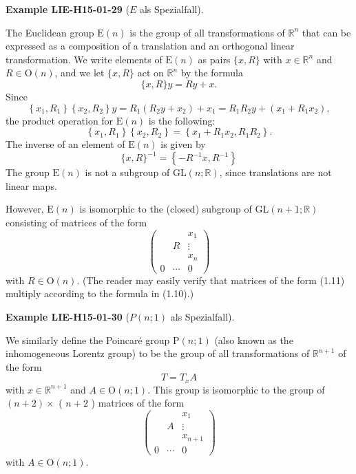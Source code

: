 \documentclass[10pt, letterpaper]{article}
\newcommand{\CustomHeading}[3]{%
  \par\medskip\noindent%
  \textbf{#1 #2} \textnormal{(#3)}.\enskip%
}
\newenvironment{EXA}[2]{\CustomHeading{Example}{#1}{#2}}{}
\begin{document}
\begin{EXA}{LIE-H15-01-29}{$E$ als Spezialfall}
The Euclidean group $\mathrm{E}(n)$ is the group of all transformations of $\mathbb{R}^{n}$ that can be expressed as a composition of a translation and an orthogonal linear transformation. We write elements of $\mathrm{E}(n)$ as pairs $\{x, R\}$ with $x \in \mathbb{R}^{n}$ and $R \in \mathrm{O}(n)$, and we let $\{x, R\}$ act on $\mathbb{R}^{n}$ by the formula
$$
\{x, R\} y=R y+x .
$$
Since
$$
\left\{x_{1}, R_{1}\right\}\left\{x_{2}, R_{2}\right\} y=R_{1}\left(R_{2} y+x_{2}\right)+x_{1}=R_{1} R_{2} y+\left(x_{1}+R_{1} x_{2}\right),
$$
the product operation for $\mathrm{E}(n)$ is the following:
$$
\left\{x_{1}, R_{1}\right\}\left\{x_{2}, R_{2}\right\}=\left\{x_{1}+R_{1} x_{2}, R_{1} R_{2}\right\} .
$$
The inverse of an element of $\mathrm{E}(n)$ is given by
$$
\{x, R\}^{-1}=\left\{-R^{-1} x, R^{-1}\right\}
$$
The group $\mathrm{E}(n)$ is not a subgroup of $\mathrm{GL}(n ; \mathbb{R})$, since translations are not linear maps.

However, $\mathrm{E}(n)$ is isomorphic to the (closed) subgroup of $\mathrm{GL}(n+1 ; \mathbb{R})$ consisting of matrices of the form
$$
\left(\begin{array}{ccc} 
& & x_{1} \\
& R & \vdots \\
& & x_{n} \\
0 & \cdots & 0
\end{array}\right)
$$
with $R \in \mathrm{O}(n)$. (The reader may easily verify that matrices of the form (1.11) multiply according to the formula in (1.10).)
\end{EXA}

\begin{EXA}{LIE-H15-01-30}{$P(n;1)$ als Spezialfall}
We similarly define the Poincaré group $\mathrm{P}(n ; 1)$ (also known as the inhomogeneous Lorentz group) to be the group of all transformations of $\mathbb{R}^{n+1}$ of the form
$$
T=T_{x} A
$$
with $x \in \mathbb{R}^{n+1}$ and $A \in \mathrm{O}(n ; 1)$. This group is isomorphic to the group of $(n+2) \times$ ( $n+2$ ) matrices of the form
$$
\left(\begin{array}{ccc} 
& & x_{1} \\
& A & \vdots \\
& & x_{n+1} \\
0 & \cdots & 0
\end{array}\right)
$$
with $A \in \mathrm{O}(n ; 1)$.
\end{EXA}
\end{document}
